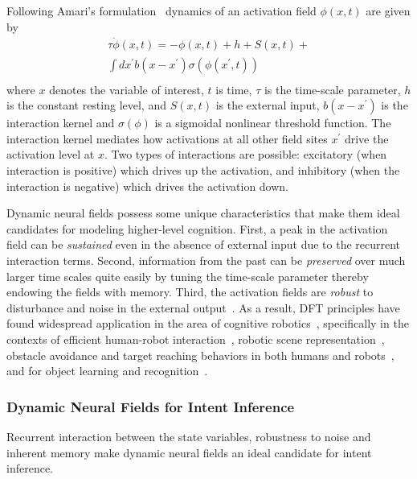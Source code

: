 \documentclass[natbib, twocolumn]{svjour3}          %
\begin{document}
Following Amari's formulation~\citep{amari1977dynamics} dynamics of an activation field $\phi(x, t)$ are given by 
\begin{multline*}
\tau\dot{\phi}(x,t) = -\phi(x,t) + h + S(x,t) + \\ \int\limits_{}^{}dx^{\prime}b(x-x^{\prime})\sigma(\phi(x^{\prime}, t)) 
\end{multline*} 
where $x$ denotes the variable of interest, $t$ is time, $\tau$ is the time-scale parameter, $h$ is the constant resting level, and $S(x,t)$ is the external input, $b(x-x^\prime)$ is the interaction kernel and $\sigma(\phi)$ is a sigmoidal nonlinear threshold function. The interaction kernel mediates how activations at all other field sites $x^\prime$ drive the activation level at $x$. Two types of interactions are possible: excitatory (when interaction is positive) which drives up the activation, and inhibitory (when the interaction is negative) which drives the activation down. 

Dynamic neural fields possess some unique characteristics that make them ideal candidates for modeling higher-level cognition. First, a peak in the activation field can be \textit{sustained} even in the absence of external input due to the recurrent interaction terms. Second, information from the past can be \textit{preserved} over much larger time scales quite easily by tuning the time-scale parameter thereby endowing the fields with memory. Third, the activation fields are \textit{robust} to disturbance and noise in the external output~\citep{schoner2008dynamical}. 
As a result, DFT principles have found widespread application in the area of cognitive robotics~\citep{erlhagen2006dynamic}, specifically in the contexts of efficient human-robot interaction~\citep{erlhagen2014dynamic}, robotic scene representation~\citep{zibner2011dynamic}, obstacle avoidance and target reaching behaviors in both humans and robots~\citep{schoner1995dynamics}, and for object learning and recognition~\citep{faubel2008learning}. 


\subsubsection{Dynamic Neural Fields for Intent Inference}\label{sssec:dft_ii}

Recurrent interaction between the state variables, 
robustness to noise and inherent memory make dynamic neural fields an ideal candidate for intent inference. 
\end{document}
